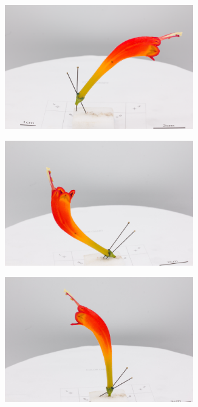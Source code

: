 \documentclass[10pt,letter,english]{article}
\begin{document}
\begin{figure}[H]
\centering
\begin{subfigure}[t]{.33\textwidth}
  \centering
  \includegraphics[width=0.9\textwidth]{Figures/flowerplacement_1.png}
  \caption{}
  \label{}
\end{subfigure}%
\begin{subfigure}[t]{.33\textwidth}
  \centering
  \includegraphics[width=0.9\textwidth]{Figures/flowerplacement_2.jpg}
  \caption{}
  \label{}
\end{subfigure}
\begin{subfigure}[t]{.33\textwidth}
  \centering
  \includegraphics[width=0.9\textwidth]{Figures/flowerplacement_3.jpg}

\end{subfigure}
\end{figure}
\end{document}
